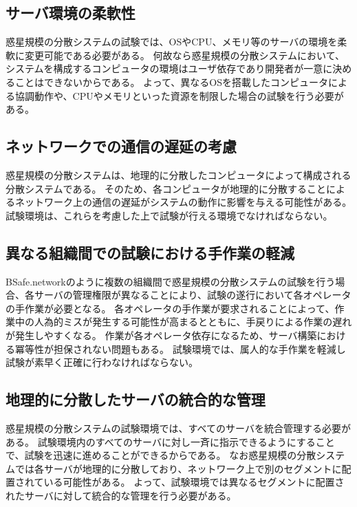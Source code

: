 {\subsection{サーバ環境の柔軟性}
\label{issue:requirements1}

惑星規模の分散システムの試験では、OSやCPU、メモリ等のサーバの環境を柔軟に変更可能である必要がある。
何故なら惑星規模の分散システムにおいて、システムを構成するコンピュータの環境はユーザ依存であり開発者が一意に決めることはできないからである。
よって、異なるOSを搭載したコンピュータによる協調動作や、CPUやメモリといった資源を制限した場合の試験を行う必要がある。

\subsection{ネットワークでの通信の遅延の考慮}
\label{issue:requirements2}

惑星規模の分散システムは、地理的に分散したコンピュータによって構成される分散システムである。
そのため、各コンピュータが地理的に分散することによるネットワーク上の通信の遅延がシステムの動作に影響を与える可能性がある。
試験環境は、これらを考慮した上で試験が行える環境でなければならない。

\subsection{異なる組織間での試験における手作業の軽減}
\label{issue:requirements3}

BSafe.networkのように複数の組織間で惑星規模の分散システムの試験を行う場合、各サーバの管理権限が異なることにより、試験の遂行において各オペレータの手作業が必要となる。
各オペレータの手作業が要求されることによって、作業中の人為的ミスが発生する可能性が高まるとともに、手戻りによる作業の遅れが発生しやすくなる。
作業が各オペレータ依存になるため、サーバ構築における冪等性が担保されない問題もある。
試験環境では、属人的な手作業を軽減し試験が素早く正確に行わなければならない。

\subsection{地理的に分散したサーバの統合的な管理}
\label{issue:requirements4}

惑星規模の分散システムの試験環境では、すべてのサーバを統合管理する必要がある。
試験環境内のすべてのサーバに対し一斉に指示できるようにすることで、試験を迅速に進めることができるからである。
なお惑星規模の分散システムでは各サーバが地理的に分散しており、ネットワーク上で別のセグメントに配置されている可能性がある。
よって、試験環境では異なるセグメントに配置されたサーバに対して統合的な管理を行う必要がある。

}
